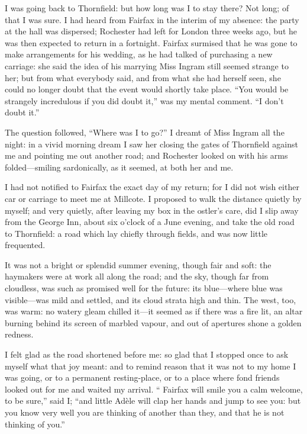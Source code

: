 I was going back to Thornfield: but how long was I to stay there? Not
long; of that I was sure. I had heard from \Mrs{} Fairfax in the interim
of my absence: the party at the hall was dispersed; \Mr{} Rochester had
left for London three weeks ago, but he was then expected to return in a
fortnight. \Mrs{} Fairfax surmised that he was gone to make arrangements
for his wedding, as he had talked of purchasing a new carriage: she said
the idea of his marrying Miss Ingram still seemed strange to her; but
from what everybody said, and from what she had herself seen, she could
no longer doubt that the event would shortly take place. \enquote{You
would be strangely incredulous if you did doubt it,} was my mental
comment. \enquote{I don't doubt it.}

The question followed, \enquote{Where was I to go?} I dreamt of Miss
Ingram all the night: in a vivid morning dream I saw her closing the
gates of Thornfield against me and pointing me out another road; and \Mr{}
 Rochester looked on with his arms folded---smiling sardonically, as it
seemed, at both her and me.

I had not notified to \Mrs{} Fairfax the exact day of my return; for I did
not wish either car or carriage to meet me at Millcote. I proposed to
walk the distance quietly by myself; and very quietly, after leaving my
box in the ostler's care, did I slip away from the George Inn, about six
o'clock of a June evening, and take the old road to Thornfield: a road
which lay chiefly through fields, and was now little frequented.

It was not a bright or splendid summer evening, though fair and soft:
the haymakers were at work all along the road; and the sky, though far
from cloudless, was such as promised well for the future: its
blue---where blue was visible---was mild and settled, and its cloud
strata high and thin. The west, too, was warm: no watery gleam chilled
it---it seemed as if there was a fire lit, an altar burning behind its
screen of marbled vapour, and out of apertures shone a golden redness.

I felt glad as the road shortened before me: so glad that I stopped once
to ask myself what that joy meant: and to remind reason that it was not
to my home I was going, or to a permanent resting-place, or to a place
where fond friends looked out for me and waited my arrival. 
\enquote{\Mrs{} Fairfax will smile you a calm welcome, to be sure,} said
I; \enquote{and little Adèle will clap her hands and jump to see you:
but you know very well you are thinking of another than they, and that
he is not thinking of you.}


